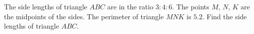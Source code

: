 The side lengths of triangle $ABC$ are in the ratio $3:4:6$. The points $M$, $N$, $K$ are the midpoints of the sides. The perimeter of triangle $MNK$ is $5.2$. Find the side lengths of triangle $ABC$.
